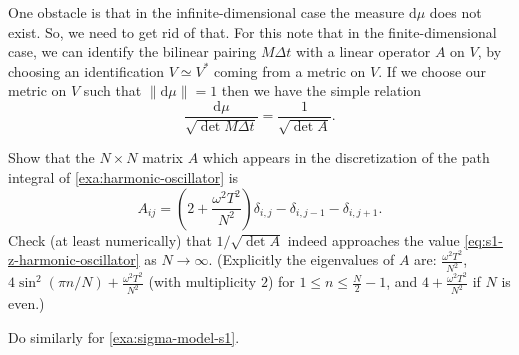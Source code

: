 \documentclass[12pt,letterpaper,reqno]{article}
\numberwithin{equation}{section}
\newcommand{\de}{\mathrm{d}}
\newcommand{\norm}[1]{\lVert#1\rVert}
\begin{document}
One obstacle is that in the infinite-dimensional case the measure $\de \mu$ does not exist.
So, we need to get rid of that.
For this note that in the finite-dimensional case, we can identify the bilinear pairing
$M \Delta t$ with a linear operator $A$ on $V$, 
by choosing an identification $V \simeq V^*$ coming from a metric
on $V$. If we choose our metric on $V$ such that $\norm{\de \mu} = 1$ then we have the simple relation
\begin{equation}
  \frac{\de \mu}{\sqrt{\det M \Delta t}} = \frac{1}{\sqrt{\det A}}.
\end{equation}

\begin{exercise} Show that the $N \times N$ matrix $A$ which appears
in the discretization of the path integral of 
\autoref{exa:harmonic-oscillator} is 
\begin{equation}
  A_{ij} = \left(2 + \frac{\omega^2 T^2}{N^2}\right) \delta_{i,j} - \delta_{i,j-1} - \delta_{i,j+1}.
\end{equation}
Check (at least numerically) that $1 / \sqrt{\det A}$
indeed approaches the value \eqref{eq:s1-z-harmonic-oscillator} as $N \to \infty$.
(Explicitly the eigenvalues of $A$ are: $\frac{\omega^2 T^2}{N^2}$,
$4 \sin^2(\pi n / N) + \frac{\omega^2 T^2}{N^2}$ (with multiplicity $2$) for $1 \le n \le \frac{N}{2}-1$, and $4 + \frac{\omega^2 T^2}{N^2}$ if $N$ is even.)
\end{exercise}

\begin{exercise}
Do similarly for \autoref{exa:sigma-model-s1}.
\end{exercise}
\end{document}

